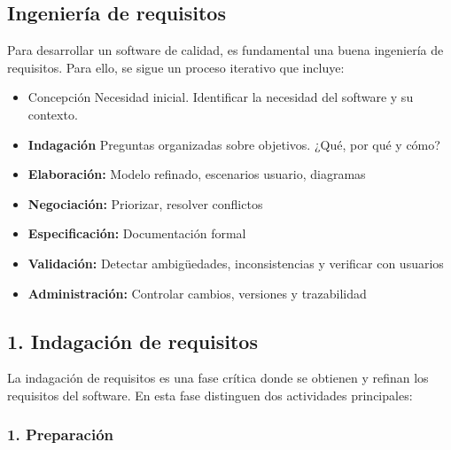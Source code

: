     \subsection{Ingeniería de requisitos}\label{subsec:ingenieria-de-requisitos}
    Para desarrollar un software de calidad, es fundamental una buena ingeniería de requisitos.
    Para ello, se sigue un proceso iterativo que incluye:

    \begin{itemize}
        \item Concepción Necesidad inicial.
        Identificar la necesidad del software y su contexto.

        \item \textbf{Indagación} Preguntas organizadas sobre objetivos.
        ¿Qué, por qué y cómo?

        \item \textbf{Elaboración:} Modelo refinado, escenarios usuario, diagramas

        \item \textbf{Negociación:} Priorizar, resolver conflictos

        \item \textbf{Especificación:} Documentación formal

        \item \textbf{Validación:} Detectar ambigüedades, inconsistencias y verificar con usuarios

        \item \textbf{Administración:} Controlar cambios, versiones y trazabilidad
    \end{itemize}

    \subsection*{1. Indagación de requisitos}\label{subsec:indagacion-de-requisitos}

    La indagación de requisitos es una fase crítica donde se obtienen y refinan los requisitos del software.
    En esta fase distinguen dos actividades principales:

    \subsubsection*{1. Preparación}


